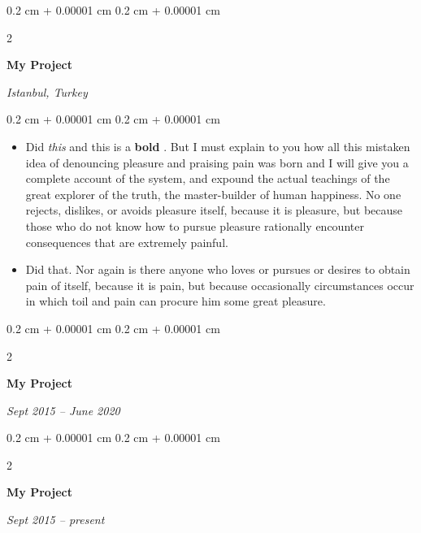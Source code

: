 \documentclass[10pt, letterpaper]{article}
\newenvironment{highlights}{
    \begin{itemize}[
        topsep=0.10 cm,
        parsep=0.10 cm,
        partopsep=0pt,
        itemsep=0pt,
        leftmargin=0.4 cm + 10pt
    ]
}{
    \end{itemize}
} %
\newenvironment{onecolentry}{
    \begin{adjustwidth}{
        0.2 cm + 0.00001 cm
    }{
        0.2 cm + 0.00001 cm
    }
}{
    \end{adjustwidth}
} %
\newenvironment{twocolentry}[2][]{
    \onecolentry
    \def\secondColumn{#2}
    \setcolumnwidth{\fill, 4.5 cm}
    \begin{paracol}{2}
}{
    \switchcolumn \raggedleft \secondColumn
    \end{paracol}
    \endonecolentry
} %
\let\hrefWithoutArrow\href
\renewcommand{\href}[2]{\hrefWithoutArrow{#1}{\ifthenelse{\equal{#2}{}}{ }{#2 }\raisebox{.15ex}{\footnotesize \faExternalLink*}}}
\begin{document}
        \vspace{0.2 cm}

        \begin{twocolentry}{
        \textit{Istanbul, Turkey}    
            
        }
            \textbf{My Project}
        \end{twocolentry}

        \vspace{0.10 cm}
        \begin{onecolentry}
            \begin{highlights}
                \item Did \textit{this} and this is a \textbf{bold} \href{https://example.com}{link}. But I must explain to you how all this mistaken idea of denouncing pleasure and praising pain was born and I will give you a complete account of the system, and expound the actual teachings of the great explorer of the truth, the master-builder of human happiness. No one rejects, dislikes, or avoids pleasure itself, because it is pleasure, but because those who do not know how to pursue pleasure rationally encounter consequences that are extremely painful.
                \item Did that. Nor again is there anyone who loves or pursues or desires to obtain pain of itself, because it is pain, but because occasionally circumstances occur in which toil and pain can procure him some great pleasure.
            \end{highlights}
        \end{onecolentry}


        \vspace{0.2 cm}

        \begin{twocolentry}{
            
            
        \textit{Sept 2015 – June 2020}}
            \textbf{My Project}
        \end{twocolentry}



        \vspace{0.2 cm}

        \begin{twocolentry}{
            
            
        \textit{Sept 2015 – present}}
            \textbf{My Project}
        \end{twocolentry}



        \vspace{0.2 cm}
\end{document}
